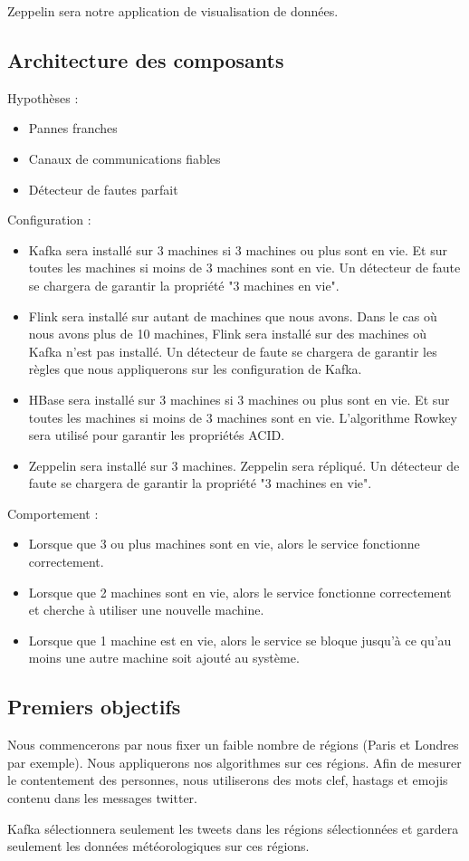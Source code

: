 \documentclass[a4paper,oneside,10pt]{article}
\begin{document}
Zeppelin sera notre application de visualisation de données. 

\subsection{Architecture des composants}

Hypothèses : 
\begin{itemize}
	\item Pannes franches
	\item Canaux de communications fiables
	\item Détecteur de fautes parfait
\end{itemize}

Configuration : 
\begin{itemize}
	\item Kafka sera installé sur 3 machines si 3 machines ou plus sont en vie. Et sur toutes les machines si moins de 3 machines sont en vie. Un détecteur de faute se chargera de garantir la propriété "3 machines en vie".
	\item Flink sera installé sur autant de machines que nous avons. Dans le cas où nous avons plus de 10 machines, Flink sera installé sur des machines où Kafka n'est pas installé. Un détecteur de faute se chargera de garantir les règles que nous appliquerons sur les configuration de Kafka. 
	\item HBase sera installé sur 3 machines si 3 machines ou plus sont en vie. Et sur toutes les machines si moins de 3 machines sont en vie. L'algorithme Rowkey sera utilisé pour garantir les propriétés ACID.
	\item Zeppelin sera installé sur 3 machines. Zeppelin sera répliqué. Un détecteur de faute se chargera de garantir la propriété "3 machines en vie".
\end{itemize}

Comportement : 
\begin{itemize}
	\item Lorsque que 3 ou plus machines sont en vie, alors le service fonctionne correctement.
	\item Lorsque que 2 machines sont en vie, alors le service fonctionne correctement et cherche à utiliser une nouvelle machine.
	\item Lorsque que 1 machine est en vie, alors le service se bloque jusqu'à ce qu'au moins une autre machine soit ajouté au système. 
\end{itemize}


\subsection{Premiers objectifs}

Nous commencerons par nous fixer un faible nombre de régions (Paris et Londres par exemple). Nous appliquerons nos algorithmes sur ces régions. 
Afin de mesurer le contentement des personnes, nous utiliserons des mots clef, hastags et emojis contenu dans les messages twitter. 

Kafka sélectionnera seulement les tweets dans les régions sélectionnées et gardera seulement les données météorologiques sur ces régions. 
\end{document}
